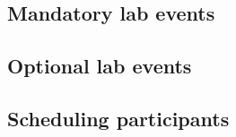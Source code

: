 \documentclass{tufte-book} %
\begin{document}
 \subsection{Mandatory lab events}
 \subsection{Optional lab events}
 \subsection{Scheduling participants}






\end{document}

